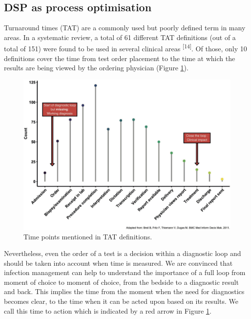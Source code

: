 \documentclass[
]{book}
\begin{document}
\hypertarget{dsp-as-process-optimisation}{%
\subsection{DSP as process optimisation}\label{dsp-as-process-optimisation}}

Turnaround times (TAT) are a commonly used but poorly defined term in many areas. In a systematic review, a total of 61 different TAT definitions (out of a total of 151) were found to be used in several clinical areas \textsuperscript{{[}14{]}}. Of those, only 10 definitions cover the time from test order placement to the time at which the results are being viewed by the ordering physician (Figure \ref{fig:fig2-4}).

\begin{figure}

{\centering \includegraphics[width=1\linewidth]{images/02-04} 

}

\caption{Time points mentioned in TAT definitions.}\label{fig:fig2-4}
\end{figure}

Nevertheless, even the order of a test is a decision within a diagnostic loop and should be taken into account when time is measured. We are convinced that infection management can help to understand the importance of a full loop from moment of choice to moment of choice, from the bedside to a diagnostic result and back. This implies the time from the moment when the need for diagnostics becomes clear, to the time when it can be acted upon based on its results. We call this time to action which is indicated by a red arrow in Figure \ref{fig:fig2-4}.
\end{document}
